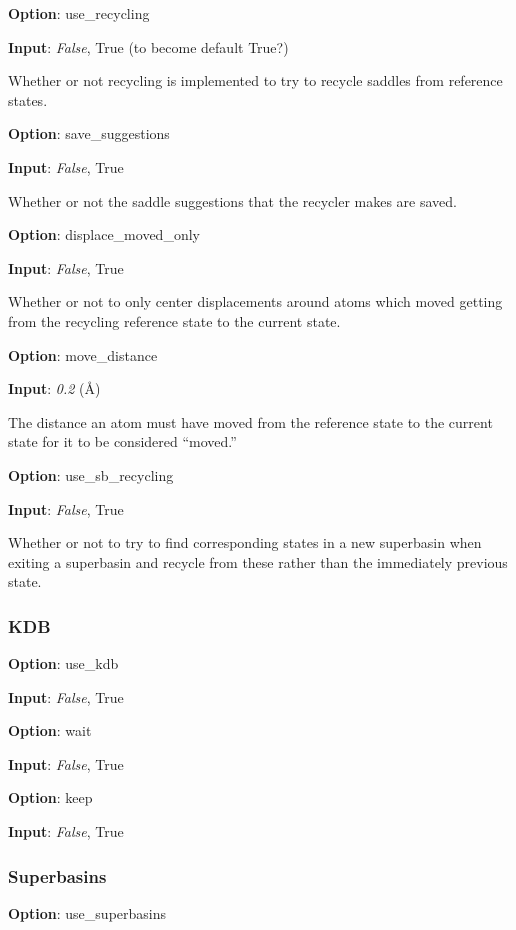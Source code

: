 \documentclass{article}
\begin{document}
\noindent\textbf{Option}:  use\_recycling

\noindent\textbf{Input}:  \emph{False}, True (to become default True?)

Whether or not recycling is implemented to try to recycle saddles from reference states.

\noindent\textbf{Option}:  save\_suggestions

\noindent\textbf{Input}:  \emph{False}, True

Whether or not the saddle suggestions that the recycler makes are saved.

\noindent\textbf{Option}:  displace\_moved\_only

\noindent\textbf{Input}:  \emph{False}, True

Whether or not to only center displacements around atoms which moved getting from the recycling reference state to the current state.

\noindent\textbf{Option}:  move\_distance

\noindent\textbf{Input}:  \emph{0.2} (\AA)

The distance an atom must have moved from the reference state to the current state for it to be considered ``moved.''

\noindent\textbf{Option}:  use\_sb\_recycling

\noindent\textbf{Input}:  \emph{False}, True

Whether or not to try to find corresponding states in a new superbasin when exiting a superbasin and recycle from these rather than the immediately previous state.

\subsubsection{KDB}

\noindent\textbf{Option}:  use\_kdb

\noindent\textbf{Input}:  \emph{False}, True

\noindent\textbf{Option}:  wait

\noindent\textbf{Input}:  \emph{False}, True

\noindent\textbf{Option}:  keep

\noindent\textbf{Input}:  \emph{False}, True

\subsubsection{Superbasins}

\noindent\textbf{Option}:  use\_superbasins
\end{document}

